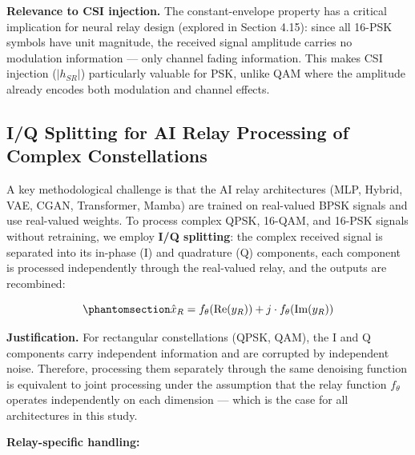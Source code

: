 \documentclass[
  english,
  12pt,
  12pt,
  a4paper,
  oneside]{report}
\begin{document}
\textbf{Relevance to CSI injection.} The constant-envelope property has a critical implication for neural relay design (explored in Section 4.15): since all 16-PSK symbols have unit magnitude, the received signal amplitude carries no modulation information --- only channel fading information. This makes CSI injection (\(|h_{SR}|\)) particularly valuable for PSK, unlike QAM where the amplitude already encodes both modulation and channel effects.

\subsection{I/Q Splitting for AI Relay Processing of Complex Constellations}\label{sec:iq-splitting-for-ai-relay-processing-of-complex-constellations}

A key methodological challenge is that the AI relay architectures (MLP, Hybrid, VAE, CGAN, Transformer, Mamba) are trained on real-valued BPSK signals and use real-valued weights. To process complex QPSK, 16-QAM, and 16-PSK signals without retraining, we employ \textbf{I/Q splitting}: the complex received signal is separated into its in-phase (I) and quadrature (Q) components, each component is processed independently through the real-valued relay, and the outputs are recombined:

\begin{equation}\protect\phantomsection\label{eq:iq-splitting}{\hat{x}_R = f_\theta(\text{Re}(y_R)) + j \cdot f_\theta(\text{Im}(y_R))
}\end{equation}

\textbf{Justification.} For rectangular constellations (QPSK, QAM), the I and Q components carry independent information and are corrupted by independent noise. Therefore, processing them separately through the same denoising function is equivalent to joint processing under the assumption that the relay function \(f_\theta\) operates independently on each dimension --- which is the case for all architectures in this study.

\textbf{Relay-specific handling:}
\end{document}
